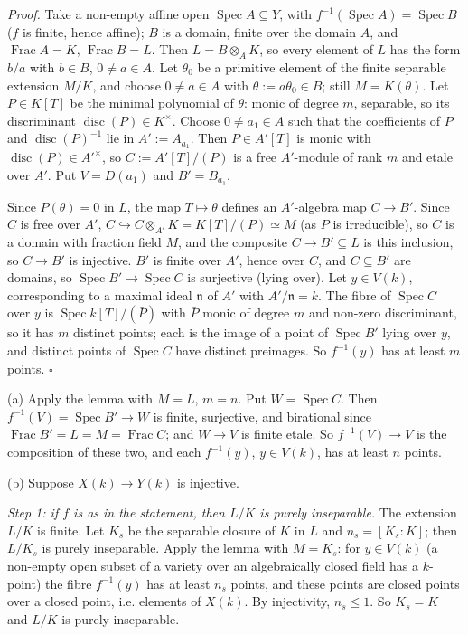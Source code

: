 \documentclass[11pt]{article}
\begin{document}
\emph{Proof.} Take a non-empty affine open $\operatorname{Spec}A\subseteq Y$, with $f^{-1}(\operatorname{Spec}A)=\operatorname{Spec}B$ ($f$ is finite, hence affine); $B$ is a domain, finite over the domain $A$, and $\operatorname{Frac}A=K$, $\operatorname{Frac}B=L$. Then $L=B\otimes_AK$, so every element of $L$ has the form $b/a$ with $b\in B$, $0\ne a\in A$. Let $\theta_0$ be a primitive element of the finite separable extension $M/K$, and choose $0\ne a\in A$ with $\theta:=a\theta_0\in B$; still $M=K(\theta)$. Let $P\in K[T]$ be the minimal polynomial of $\theta$: monic of degree $m$, separable, so its discriminant $\operatorname{disc}(P)\in K^\times$. Choose $0\ne a_1\in A$ such that the coefficients of $P$ and $\operatorname{disc}(P)^{-1}$ lie in $A':=A_{a_1}$. Then $P\in A'[T]$ is monic with $\operatorname{disc}(P)\in A'^\times$, so $C:=A'[T]/(P)$ is a free $A'$-module of rank $m$ and etale over $A'$. Put $V=D(a_1)$ and $B'=B_{a_1}$.

Since $P(\theta)=0$ in $L$, the map $T\mapsto\theta$ defines an $A'$-algebra map $C\to B'$. Since $C$ is free over $A'$, $C\hookrightarrow C\otimes_{A'}K=K[T]/(P)\simeq M$ (as $P$ is irreducible), so $C$ is a domain with fraction field $M$, and the composite $C\to B'\subseteq L$ is this inclusion, so $C\to B'$ is injective. $B'$ is finite over $A'$, hence over $C$, and $C\subseteq B'$ are domains, so $\operatorname{Spec}B'\to\operatorname{Spec}C$ is surjective (lying over). Let $y\in V(k)$, corresponding to a maximal ideal $\mathfrak n$ of $A'$ with $A'/\mathfrak n=k$. The fibre of $\operatorname{Spec}C$ over $y$ is $\operatorname{Spec}k[T]/(\bar P)$ with $\bar P$ monic of degree $m$ and non-zero discriminant, so it has $m$ distinct points; each is the image of a point of $\operatorname{Spec}B'$ lying over $y$, and distinct points of $\operatorname{Spec}C$ have distinct preimages. So $f^{-1}(y)$ has at least $m$ points. \hfill$\square$

(a) Apply the lemma with $M=L$, $m=n$. Put $W=\operatorname{Spec}C$. Then $f^{-1}(V)=\operatorname{Spec}B'\to W$ is finite, surjective, and birational since $\operatorname{Frac}B'=L=M=\operatorname{Frac}C$; and $W\to V$ is finite etale. So $f^{-1}(V)\to V$ is the composition of these two, and each $f^{-1}(y)$, $y\in V(k)$, has at least $n$ points.

(b) Suppose $X(k)\to Y(k)$ is injective.

\emph{Step 1: if $f$ is as in the statement, then $L/K$ is purely inseparable.} The extension $L/K$ is finite. Let $K_s$ be the separable closure of $K$ in $L$ and $n_s=[K_s:K]$; then $L/K_s$ is purely inseparable. Apply the lemma with $M=K_s$: for $y\in V(k)$ (a non-empty open subset of a variety over an algebraically closed field has a $k$-point) the fibre $f^{-1}(y)$ has at least $n_s$ points, and these points are closed points over a closed point, i.e. elements of $X(k)$. By injectivity, $n_s\le1$. So $K_s=K$ and $L/K$ is purely inseparable.
\end{document}
